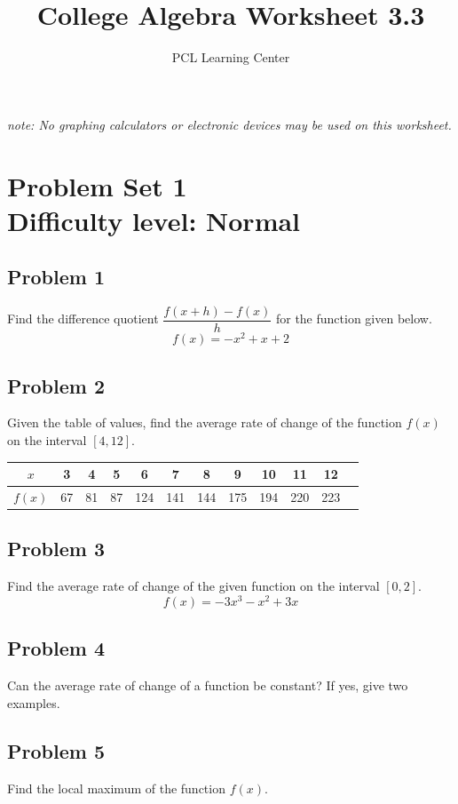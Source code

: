 \documentclass[12pt]{article}
\title{College Algebra Worksheet 3.3}
\author{PCL Learning Center}
\date{}
\begin{document}
\maketitle

\begin{center}
    \textit{note: No graphing calculators or electronic devices may be used on this worksheet.}    
\end{center}

\section*{Problem Set 1\\Difficulty level: Normal}
\subsection*{Problem 1}
Find the difference quotient \(\dfrac{f(x+h)-f(x)}{h}\) for the function given below.
\[f(x)=-x^2+x+2\]

\subsection*{Problem 2}
Given the table of values, find the average rate of change of the function \(f(x)\) on the interval \([4,12]\).

    \begin{center}
    \begin{tabular}{|*{12}{c|}}
    \hline
    \(x\) & 3 & 4 & 5 & 6 & 7 & 8 & 9 & 10 & 11 & 12\\
    \hline
    \(f(x)\) & 67 & 81 & 87 & 124 & 141 & 144 & 175 & 194 & 220 & 223\\
    \hline
    \end{tabular}
    \end{center}

\subsection*{Problem 3}
Find the average rate of change of the given function on the interval \([0,2]\).
\[f(x)=-3x^3-x^2+3x\]

\subsection*{Problem 4}
Can the average rate of change of a function be constant? If yes, give two examples.
\newpage
\subsection*{Problem 5}
Find the local maximum of the function \(f(x)\).
\end{document}
